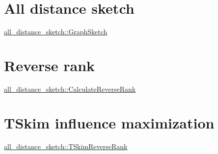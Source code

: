 \hypertarget{Overview_ADS}{}\section{All distance sketch}\label{Overview_ADS}
\hyperlink{classall__distance__sketch_1_1GraphSketch}{all\+\_\+distance\+\_\+sketch\+::\+Graph\+Sketch}\hypertarget{Overview_RRank}{}\section{Reverse rank}\label{Overview_RRank}
\hyperlink{namespaceall__distance__sketch_a025f777de5a9df1594dd306f9037f385}{all\+\_\+distance\+\_\+sketch\+::\+Calculate\+Reverse\+Rank}\hypertarget{Overview_TSkim}{}\section{T\+Skim influence maximization}\label{Overview_TSkim}
\hyperlink{classall__distance__sketch_1_1TSkimReverseRank}{all\+\_\+distance\+\_\+sketch\+::\+T\+Skim\+Reverse\+Rank} 